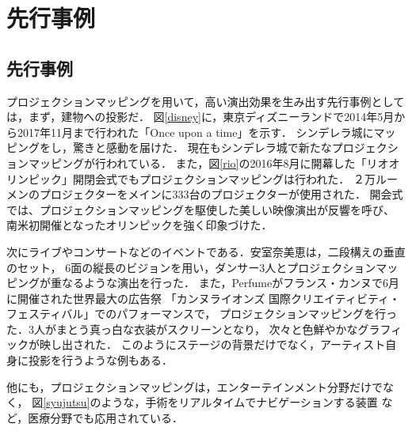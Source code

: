 \chapter{先行事例}
\thispagestyle{fancy}

\section{先行事例}
プロジェクションマッピングを用いて，高い演出効果を生み出す先行事例としては，まず，建物への投影だ．
図\ref{disney}に，東京ディズニーランドで2014年5月から2017年11月まで行われた「Once upon a time」を示す．%
シンデレラ城にマッピングをし，驚きと感動を届けた．
現在もシンデレラ城で新たなプロジェクションマッピングが行われている\cite{once}．
また，図\ref{rio}の2016年8月に開幕した「リオオリンピック」開閉会式でもプロジェクションマッピングは行われた． 
２万ルーメンのプロジェクターをメインに333台のプロジェクターが使用された．
開会式では、プロジェクションマッピングを駆使した美しい映像演出が反響を呼び、
南米初開催となったオリンピックを強く印象づけた\cite{olympic}．

次にライブやコンサートなどのイベントである．安室奈美恵は，二段構えの垂直のセット，
6面の縦長のビジョンを用い，ダンサー3人とプロジェクションマッピングが重なるような演出を行った\cite{amuro}．
また，Perfumeがフランス・カンヌで6月に開催された世界最大の広告祭
「カンヌライオンズ 国際クリエイティビティ・フェスティバル」でのパフォーマンスで，
プロジェクションマッピングを行った．3人がまとう真っ白な衣装がスクリーンとなり，
次々と色鮮やかなグラフィックが映し出された．%
このようにステージの背景だけでなく，アーティスト自身に投影を行うような例もある．

他にも，プロジェクションマッピングは，エンターテインメント分野だけでなく，
図\ref{syujutsu}のような，手術をリアルタイムでナビゲーションする装置%
など，医療分野でも応用されている．


\clearpage

